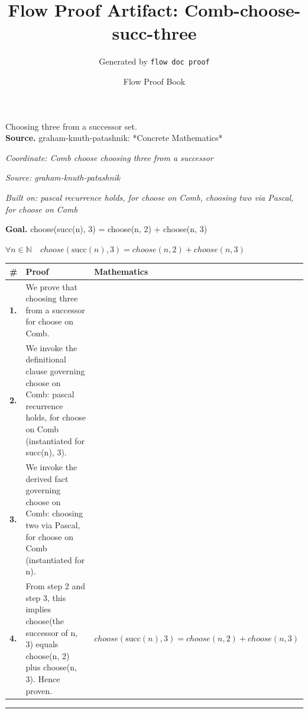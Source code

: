 \documentclass[11pt]{article}
\title{Flow Proof Artifact: Comb-choose-succ-three}
\author{Generated by \texttt{flow doc proof}}
\date{Flow Proof Book}
\theoremstyle{definition}
\begin{document}
\maketitle
Choosing three from a successor set.\\[0.5em]
\textbf{Source.} graham-knuth-patashnik: *Concrete Mathematics*\\[0.5em]
\bigskip
{}\par
\smallskip\noindent\textit{Coordinate: Comb \cdot choose \cdot choosing three from a successor}\par
\smallskip\noindent\textit{Source: graham-knuth-patashnik}\par
\smallskip\noindent\textit{Built on: pascal recurrence holds, for choose on Comb, choosing two via Pascal, for choose on Comb}\par
\medskip
\noindent\textbf{Goal.} choose(succ(n), 3) = choose(n, 2) + choose(n, 3)\par
\noindent$\displaystyle \forall n \in \mathbb{N}\quad choose(\mathrm{succ}(n), 3) = choose(n, 2) + choose(n, 3)$\par
\medskip
\noindent
\begin{tabular}{@{} >{\raggedright\arraybackslash}p{} >{\raggedright\arraybackslash}p{} >{\raggedleft\arraybackslash}p{} @{}}
\textbf{\#} & \textbf{Proof} & \textbf{Mathematics} \\
\midrule
\textbf{1.} & We prove that choosing three from a successor for choose on Comb. & \\[0.45em]
\textbf{2.} & We invoke the definitional clause governing choose on Comb: pascal recurrence holds, for choose on Comb (instantiated for succ(n), 3). & \\[0.45em]
\textbf{3.} & We invoke the derived fact governing choose on Comb: choosing two via Pascal, for choose on Comb (instantiated for n). & \\[0.45em]
\textbf{4.} & From step 2 and step 3, this implies choose(the successor of n, 3) equals choose(n, 2) plus choose(n, 3). Hence proven. & $\displaystyle choose(\mathrm{succ}(n), 3) = choose(n, 2) + choose(n, 3)$ \\[0.45em]
\bottomrule
\end{tabular}
\label{thm:Comb-choose-choosing_three_from_a_successor}
\par\medskip\hrule
\end{document}
